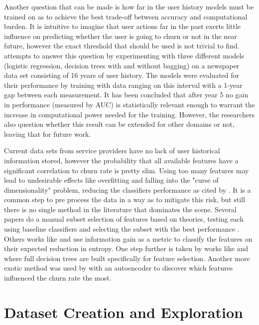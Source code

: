 \documentclass{kththesis}
\begin{document}
Another question that can be made is how far in the user history models must be trained on as to achieve the best trade-off between accuracy and computational burden. It is intuitive to imagine that user actions far in the past exerts little influence on predicting whether the user is going to churn or not in the near future, however the exact threshold that should be used is not trivial to find. \citep{Ballings2012} attempts  to answer this question by experimenting with three different models (logistic regression, decision trees with and without bagging) on a newspaper data set consisting of 16 years of user history. The models were evaluated for their performance by training with data ranging on this interval with a 1-year gap between each measurement. It has been concluded that  after year 5 no gain in performance (measured by AUC) is statistically relevant enough to warrant the increase in computational power needed for the training. However, the researchers also question whether this result can be extended for other domains or not, leaving that for future work.

Current data sets from service providers have no lack of user historical information stored, however the probability that all available features have a significant correlation to churn rate is pretty slim. Using too many features may lead to undesirable effects like overfitting and falling into the "curse of dimensionality" problem, reducing the classifiers performance as cited by \citep{guyon2003introduction}. It is a common step to pre process the data in a way as to mitigate this risk, but still there is no single method in the literature that dominates the scene. Several papers do a manual subset selection of features based on theories, testing each using baseline classifiers and selecting the subset with the best performance \citep{Pudipeddi2014}\citep{Runge2014}. Others works like \citep{Borbora2011} and \citep{Dror2012} use information gain as a metric to classify the features on their expected reduction in entropy. One step further is taken by works like \citep{Lu2014} and \citep{Khan2015} where full decision trees are built specifically for feature selection. Another more exotic method was used by \citep{Wangperawong2016} with an autoencoder to discover which features influenced the churn rate the most. 

\chapter{Dataset Creation and Exploration}
\label{cha:data}
\end{document}
